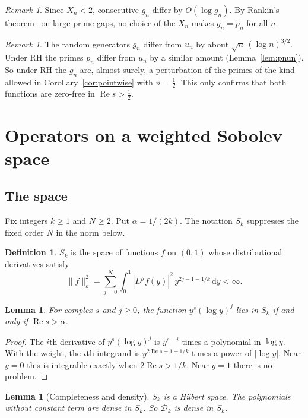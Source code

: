 \documentclass[12pt,letterpaper]{article}
\newtheorem{lemma}[theorem]{Lemma}
\theoremstyle{definition}
\newtheorem{definition}[theorem]{Definition}
\theoremstyle{remark}
\newtheorem{remark}[theorem]{Remark}
\numberwithin{equation}{section}
\newcommand{\Ree}{\operatorname{Re}}
\newcommand{\dd}{\,\mathrm{d}}
\newcommand{\Dk}{\mathcal{D}_k}
\begin{document}
\begin{remark}
Since $X_n<2$, consecutive $g_n$ differ by $O(\log g_n)$.
By Rankin's theorem~\cite{Ra38} on large prime gaps, no choice of the
$X_n$ makes $g_n=p_n$ for all $n$.
\end{remark}

\begin{remark}
The random generators $g_n$ differ from $u_n$ by about
$\sqrt{n}\,(\log n)^{3/2}$. Under RH the primes $p_n$ differ from $u_n$ by
a similar amount (Lemma~\ref{lem:pnun}). So under RH the $g_n$ are, almost
surely, a perturbation of the primes of the kind allowed in
Corollary~\ref{cor:pointwise} with $\vartheta=\frac12$. This only
confirms that both functions are zero-free in $\Ree s>\frac12$.
\end{remark}

\section{Operators on a weighted Sobolev space}\label{sec:operators}

\subsection{The space}

Fix integers $k\ge1$ and $N\ge2$. Put $\alpha=1/(2k)$.
The notation $S_k$ suppresses the fixed order $N$ in the norm below.

\begin{definition}
$S_k$ is the space of functions $f$ on $(0,1)$ whose distributional
derivatives satisfy
\[
\|f\|_k^2=\sum_{j=0}^N\int_0^1|D^jf(y)|^2\,y^{2j-1-1/k}\dd y<\infty.
\]
\end{definition}

\begin{lemma}\label{lem:powers}
For complex $s$ and $j\ge0$, the function $y^s(\log y)^j$ lies in $S_k$
if and only if $\Ree s>\alpha$.
\end{lemma}

\begin{proof}
The $i$th derivative of $y^s(\log y)^j$ is $y^{s-i}$ times a polynomial
in $\log y$. With the weight, the $i$th integrand is
$y^{2\Ree s-1-1/k}$ times a power of $|\log y|$. Near $y=0$ this is
integrable exactly when $2\Ree s>1/k$. Near $y=1$ there is no problem.
\end{proof}

\begin{lemma}[Completeness and density]\label{lem:density}
$S_k$ is a Hilbert space. The polynomials without constant term are dense
in $S_k$. So $\Dk$ is dense in $S_k$.
\end{lemma}
\end{document}
